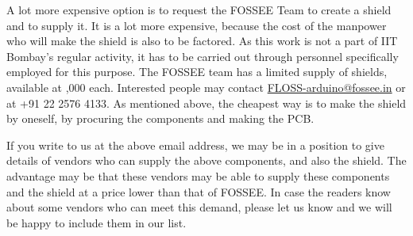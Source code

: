 A lot more expensive option is to request the FOSSEE Team to create a
shield and to supply it.  It is a lot more expensive, because the cost
of the manpower who will make the shield is also to be factored.  As
this work is not a part of IIT Bombay's regular activity, it has to be
carried out through personnel specifically employed for this purpose.
The FOSSEE team has a limited supply of shields, available at
,000 each.  Interested people may contact
\href{mailto:FLOSS-arduino@fossee.in}{FLOSS-arduino@fossee.in} or at
+91 22 2576 4133.  As mentioned above, the cheapest way is to make the
shield by oneself, by procuring the components and making the PCB.

If you write to us at the above email address, we may be in a position
to give details of vendors who can supply the above components, and
also the shield.  The advantage may be that these vendors may be able
to supply these components and the shield at a price lower than that
of FOSSEE.  In case the readers know about some vendors who can meet
this demand, please let us know and we will be happy to include them
in our list.
